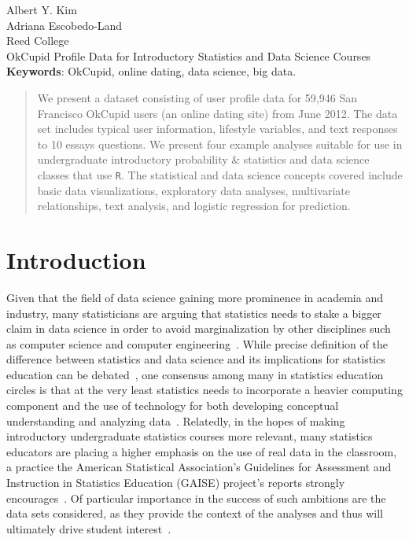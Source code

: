 \documentclass{article}\usepackage[]{graphicx}\usepackage[]{color}
\begin{document}
\noindent Albert Y. Kim\\
Adriana Escobedo-Land\\
Reed College\\
OkCupid Profile Data for Introductory Statistics and Data Science Courses\\

\noindent \textbf{Keywords}: OkCupid, online dating, data science, big data.

\begin{abstract}
We present a dataset consisting of user profile data for 59,946 San Francisco OkCupid users (an online dating site) from June 2012.  The data set includes typical user information, lifestyle variables, and text responses to 10 essays questions.  We present four example analyses suitable for use in undergraduate introductory probability \& statistics and data science classes that use \verb#R#.  The statistical and data science concepts covered include basic data visualizations, exploratory data analyses, multivariate relationships, text analysis, and logistic regression for prediction.
\end{abstract}










%
\section{Introduction}\label{intro}
%
Given that the field of data science gaining more prominence in academia and industry, many statisticians are arguing that statistics needs to stake a bigger claim in data science in order to avoid marginalization by other disciplines such as computer science and computer engineering~\cite{YU:2014,DAVIDSON:2014}.  While precise definition of the difference between statistics and data science and its implications for statistics education can be debated~\cite{WICKHAM:2014}, one consensus among many in statistics education circles is that at the very least statistics needs to incorporate a heavier computing component and the use of technology for both developing conceptual understanding and analyzing data~\cite{GAISE:05, NOLAN:LANG:2010}.  Relatedly, in the hopes of making introductory undergraduate statistics courses more relevant, many statistics educators are placing a higher emphasis on the use of real data in the classroom, a practice the American Statistical Association's Guidelines for Assessment and Instruction in Statistics Education (GAISE) project's reports strongly encourages~\cite{GAISE:05}.  Of particular importance in the success of such ambitions are the data sets considered, as they provide the context of the analyses and thus will ultimately drive student interest~\cite{GOULD:2010}.
\end{document}

